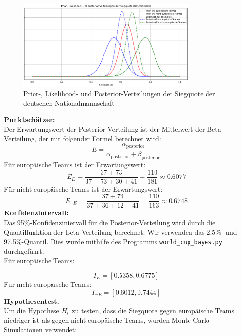 \documentclass[a4paper,12pt]{article}
\begin{document}
\begin{figure}[htbp]
  \centering
  \includegraphics[width=0.8\textwidth]{../images/world_cup.png}
  \caption{Prior-, Likelihood- und Posterior-Verteilungen der Siegquote der deutschen Nationalmannschaft}
\end{figure}
\noindent
\textbf{Punktschätzer:} \\
Der Erwartungswert der Posterior-Verteilung ist der Mittelwert der Beta-Verteilung, der mit folgender Formel berechnet wird:
\[
E = \frac{\alpha_{\text{posterior}}}{\alpha_{\text{posterior}} + \beta_{\text{posterior}}}
\]
Für europäische Teams ist der Erwartungswert:
\[
E_E = \frac{37 + 73}{37 + 73 + 30 + 41} = \frac{110}{181} \approx 0.6077
\]
Für nicht-europäische Teams ist der Erwartungswert:
\[
E_{\neg E}= \frac{37 + 73}{37 + 36 + 12 + 41} = \frac{110}{163} \approx 0.6748
\]
\textbf{Konfidenzintervall:} \\
Das 95\%-Konfidenzintervall für die Posterior-Verteilung wird durch die Quantilfunktion der Beta-Verteilung berechnet. Wir verwenden das 2.5\%- und 97.5\%-Quantil.
Dies wurde mithilfe des Programms \texttt{world\_cup\_bayes.py} durchgeführt. \\
Für europäische Teams:

\[
I_E = [0.5358, 0.6775]
\]
Für nicht-europäische Teams:
\[
I_{\neg E} = [0.6012, 0.7444]
\]
\textbf{Hypothesentest:} \\
Um die Hypothese \(H_0\) zu testen, dass die Siegquote gegen europäische Teams niedriger ist als gegen nicht-europäische Teams, wurden Monte-Carlo-Simulationen verwendet:
\end{document}
